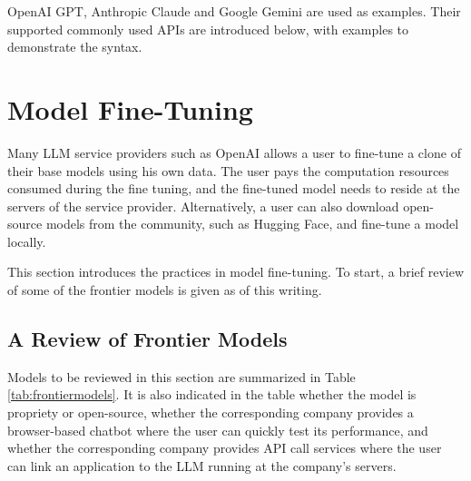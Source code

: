 OpenAI GPT, Anthropic Claude and Google Gemini are used as examples. Their supported commonly used APIs are introduced below, with examples to demonstrate the syntax. 

\section{Model Fine-Tuning}

Many LLM service providers such as OpenAI allows a user to fine-tune a clone of their base models using his own data. The user pays the computation resources consumed during the fine tuning, and the fine-tuned model needs to reside at the servers of the service provider. Alternatively, a user can also download open-source models from the community, such as Hugging Face, and fine-tune a model locally.

This section introduces the practices in model fine-tuning. To start, a brief review of some of the frontier models is given as of this writing.

\subsection{A Review of Frontier Models} \label{sec:frontierllmmodels}

Models to be reviewed in this section are summarized in Table \ref{tab:frontiermodels}. It is also indicated in the table whether the model is propriety or open-source, whether the corresponding company provides a browser-based chatbot where the user can quickly test its performance, and whether the corresponding company provides API call services where the user can link an application to the LLM running at the company's servers.

